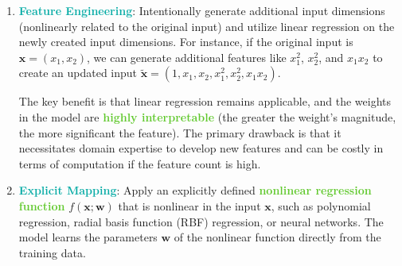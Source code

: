 \documentclass[twoside]{article}
\newcommand{\highlightbluetext}[1]{\textcolor[HTML]{09ACA6}{\textbf{#1}}}
\newcommand{\highlightgreentext}[1]{\textcolor[HTML]{62C92F}{\textbf{#1}}}
\numberwithin{equation}{section}
\begin{document}
	\begin{enumerate}
		\item \highlightbluetext{Feature Engineering}: Intentionally generate additional input dimensions (nonlinearly related to the original input) and utilize linear regression on the newly created input dimensions. For instance, if the original input is $\mathbf{x} = (x_1, x_2)$, we can generate additional features like $x_1^2$, $x_2^2$, and $x_1 x_2$ to create an updated input $\mathbf{\tilde{x}} = (1, x_1, x_2, x_1^2, x_2^2, x_1 x_2)$. 

		The key benefit is that linear regression remains applicable, and the weights in the model are \highlightgreentext{highly interpretable} (the greater the weight's magnitude, the more significant the feature). The primary drawback is that it necessitates domain expertise to develop new features and can be costly in terms of computation if the feature count is high.
		\begin{center}
		\end{center}

		\newpage
		\item \highlightbluetext{Explicit Mapping}: Apply an explicitly defined \highlightgreentext{nonlinear regression function} $f(\mathbf{x}; \mathbf{w})$ that is nonlinear in the input $\mathbf{x}$, such as polynomial regression, radial basis function (RBF) regression, or neural networks. The model learns the parameters $\mathbf{w}$ of the nonlinear function directly from the training data.
		
		\begin{center}
\end{center}
\end{enumerate}
\end{document}
